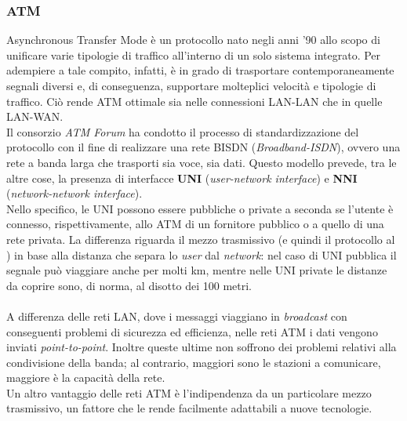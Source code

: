 \documentclass[a4paper, twoside]{article}
\def\subsub#1{\subsubsection{#1}\label{#1}}
\def\vedi#1{\nameref{#1}}
\def\italic#1{\textit{#1}}
\begin{document}
\subsub{ATM}
Asynchronous Transfer Mode è un protocollo nato negli anni '90 allo scopo di unificare varie tipologie di traffico all'interno di un solo sistema integrato. Per adempiere a tale compito, infatti, è in grado di trasportare contemporaneamente segnali diversi e, di conseguenza, supportare molteplici velocità e tipologie di traffico. Ciò rende ATM ottimale sia nelle connessioni LAN-LAN che in quelle LAN-WAN.
\\Il consorzio \textit{ATM Forum} ha condotto il processo di standardizzazione del protocollo con il fine di realizzare una rete BISDN (\textit{Broadband-ISDN}), ovvero una rete a banda larga che trasporti sia voce, sia dati. Questo modello prevede, tra le altre cose, la presenza di interfacce \textbf{UNI} (\textit{user-network interface}) e \textbf{NNI} (\textit{network-network interface}).
\\Nello specifico, le UNI possono essere pubbliche o private a seconda se l'utente è connesso, rispettivamente, allo \vedi{Switch} ATM di un fornitore pubblico o a quello di una rete privata. La differenza riguarda il mezzo trasmissivo (e quindi il protocollo al \vedi{Livello fisico}) in base alla distanza che separa lo \textit{user} dal \textit{network}: nel caso di UNI pubblica il segnale può viaggiare anche per molti km, mentre nelle UNI private le distanze da coprire sono, di norma, al disotto dei 100 metri.
\\\\A differenza delle reti LAN, dove i messaggi viaggiano in \italic{broadcast} con conseguenti problemi di sicurezza ed efficienza, nelle reti ATM i dati vengono inviati \italic{point-to-point}. Inoltre queste ultime non soffrono dei problemi relativi alla condivisione della banda; al contrario, maggiori sono le stazioni a comunicare, maggiore è la capacità della rete.
\\Un altro vantaggio delle reti ATM è l'indipendenza da un particolare mezzo trasmissivo, un fattore che le rende facilmente adattabili a nuove tecnologie.
\end{document}
